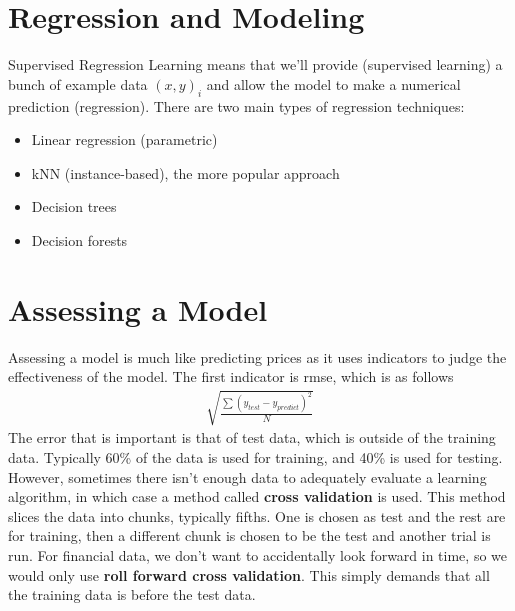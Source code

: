 \section{Regression and Modeling}
\noindent Supervised Regression Learning means that we'll provide (supervised learning) a bunch of example data $(x,y)_i$ and allow the model to make a numerical prediction (regression). There are two main types of regression techniques:
\begin{itemize}
\item Linear regression (parametric)
\item \ac{kNN} (instance-based), the more popular approach
\item Decision trees
\item Decision forests
\end{itemize}

\section{Assessing a Model}
Assessing a model is much like predicting prices as it uses indicators to judge the effectiveness of the model. The first indicator is \ac{rmse}, which is as follows
\begin{align*}
\sqrt{\frac{\sum(y_{test}-y_{predict})^2}{N}}
\end{align*}
The error that is important is that of test data, which is outside of the training data. Typically 60\% of the data is used for training, and 40\% is used for testing. However, sometimes there isn't enough data to adequately evaluate a learning algorithm, in which case a method called \textbf{cross validation} is used. This method slices the data into chunks, typically fifths. One is chosen as test and the rest are for training, then a different chunk is chosen to be the test and another trial is run. For financial data, we don't want to accidentally look forward in time, so we would only use \textbf{roll forward cross validation}. This simply demands that all the training data is before the test data. \\

